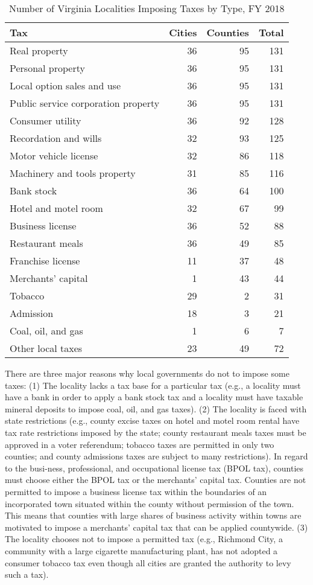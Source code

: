 \documentclass[
]{book}
\begin{document}
\begin{table}

\caption{\label{tab:unnamed-chunk-3}Number of Virginia Localities Imposing Taxes by Type, FY 2018}
\centering
\begin{tabular}[t]{l|r|r|r}
\hline
Tax & Cities & Counties & Total\\
\hline
Real property & 36 & 95 & 131\\
\hline
Personal property & 36 & 95 & 131\\
\hline
Local option sales and use & 36 & 95 & 131\\
\hline
Public service corporation property & 36 & 95 & 131\\
\hline
Consumer utility & 36 & 92 & 128\\
\hline
Recordation and wills & 32 & 93 & 125\\
\hline
Motor vehicle license & 32 & 86 & 118\\
\hline
Machinery and tools property & 31 & 85 & 116\\
\hline
Bank stock & 36 & 64 & 100\\
\hline
Hotel and motel room & 32 & 67 & 99\\
\hline
Business license & 36 & 52 & 88\\
\hline
Restaurant meals & 36 & 49 & 85\\
\hline
Franchise license & 11 & 37 & 48\\
\hline
Merchants’ capital & 1 & 43 & 44\\
\hline
Tobacco & 29 & 2 & 31\\
\hline
Admission & 18 & 3 & 21\\
\hline
Coal, oil, and gas & 1 & 6 & 7\\
\hline
Other local taxes & 23 & 49 & 72\\
\hline
\end{tabular}
\end{table}

There are three major reasons why local governments do not to impose some taxes: (1) The locality lacks a tax base for a particular tax (e.g., a locality must have a bank in order to apply a bank stock tax and a locality must have taxable mineral deposits to impose coal, oil, and gas taxes). (2) The locality is faced with state restrictions (e.g., county excise taxes on hotel and motel room rental have tax rate restrictions imposed by the state; county restaurant meals taxes must be approved in a voter referendum; tobacco taxes are permitted in only two counties; and county admissions taxes are subject to many restrictions). In regard to the busi-ness, professional, and occupational license tax (BPOL tax), counties must choose either the BPOL tax or the merchants' capital tax. Counties are not permitted to impose a business license tax within the boundaries of an incorporated town situated within the county without permission of the town. This means that counties with large shares of business activity within towns are motivated to impose a merchants' capital tax that can be applied countywide. (3) The locality chooses not to impose a permitted tax (e.g., Richmond City, a community with a large cigarette manufacturing plant, has not adopted a consumer tobacco tax even though all cities are granted the authority to levy such a tax).
\end{document}

